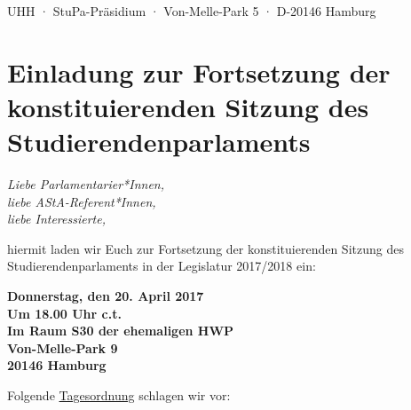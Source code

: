 \documentclass[ngerman,headheight=70pt]{scrartcl}
\begin{document}
    UHH · StuPa-Präsidium · Von-Melle-Park 5 · D-20146 Hamburg

    \section*{Einladung zur Fortsetzung der konstituierenden Sitzung des
    Studierendenparlaments}

    \textit{Liebe Parlamentarier*Innen,\\
    liebe AStA-Referent*Innen,\\
    liebe Interessierte,}

    hiermit laden wir Euch zur Fortsetzung der konstituierenden Sitzung des
    Studierendenparlaments in der Legislatur 2017/2018 ein:

    \textbf{Donnerstag, den 20. April 2017\\
    Um 18.00 Uhr c.t.\\
    Im Raum S30 der ehemaligen HWP\\
    Von-Melle-Park 9\\
    20146 Hamburg}

    Folgende \underline{Tagesordnung} schlagen wir vor:
\end{document}
